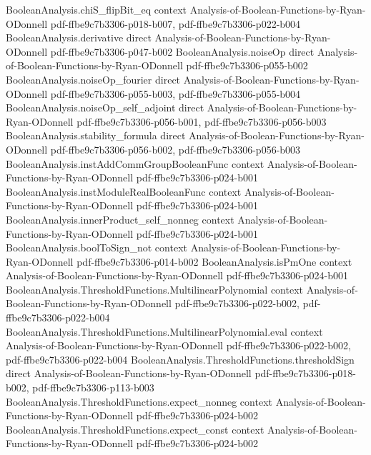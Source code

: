 \begin{lemma}
\proofstep
  {BooleanAnalysis.chiS_flipBit_eq}
  {context}
  {Analysis-of-Boolean-Functions-by-Ryan-ODonnell}
  {pdf-ffbe9c7b3306-p018-b007,
    pdf-ffbe9c7b3306-p022-b004}
\proofstep
  {BooleanAnalysis.derivative}
  {direct}
  {Analysis-of-Boolean-Functions-by-Ryan-ODonnell}
  {pdf-ffbe9c7b3306-p047-b002}
\proofstep
  {BooleanAnalysis.noiseOp}
  {direct}
  {Analysis-of-Boolean-Functions-by-Ryan-ODonnell}
  {pdf-ffbe9c7b3306-p055-b002}
\proofstep
  {BooleanAnalysis.noiseOp_fourier}
  {direct}
  {Analysis-of-Boolean-Functions-by-Ryan-ODonnell}
  {pdf-ffbe9c7b3306-p055-b003,
    pdf-ffbe9c7b3306-p055-b004}
\proofstep
  {BooleanAnalysis.noiseOp_self_adjoint}
  {direct}
  {Analysis-of-Boolean-Functions-by-Ryan-ODonnell}
  {pdf-ffbe9c7b3306-p056-b001,
    pdf-ffbe9c7b3306-p056-b003}
\proofstep
  {BooleanAnalysis.stability_formula}
  {direct}
  {Analysis-of-Boolean-Functions-by-Ryan-ODonnell}
  {pdf-ffbe9c7b3306-p056-b002,
    pdf-ffbe9c7b3306-p056-b003}
\proofstep
  {BooleanAnalysis.instAddCommGroupBooleanFunc}
  {context}
  {Analysis-of-Boolean-Functions-by-Ryan-ODonnell}
  {pdf-ffbe9c7b3306-p024-b001}
\proofstep
  {BooleanAnalysis.instModuleRealBooleanFunc}
  {context}
  {Analysis-of-Boolean-Functions-by-Ryan-ODonnell}
  {pdf-ffbe9c7b3306-p024-b001}
\proofstep
  {BooleanAnalysis.innerProduct_self_nonneg}
  {context}
  {Analysis-of-Boolean-Functions-by-Ryan-ODonnell}
  {pdf-ffbe9c7b3306-p024-b001}
\proofstep
  {BooleanAnalysis.boolToSign_not}
  {context}
  {Analysis-of-Boolean-Functions-by-Ryan-ODonnell}
  {pdf-ffbe9c7b3306-p014-b002}
\proofstep
  {BooleanAnalysis.isPmOne}
  {context}
  {Analysis-of-Boolean-Functions-by-Ryan-ODonnell}
  {pdf-ffbe9c7b3306-p024-b001}
\proofstep
  {BooleanAnalysis.ThresholdFunctions.MultilinearPolynomial}
  {context}
  {Analysis-of-Boolean-Functions-by-Ryan-ODonnell}
  {pdf-ffbe9c7b3306-p022-b002,
    pdf-ffbe9c7b3306-p022-b004}
\proofstep
  {BooleanAnalysis.ThresholdFunctions.MultilinearPolynomial.eval}
  {context}
  {Analysis-of-Boolean-Functions-by-Ryan-ODonnell}
  {pdf-ffbe9c7b3306-p022-b002,
    pdf-ffbe9c7b3306-p022-b004}
\proofstep
  {BooleanAnalysis.ThresholdFunctions.thresholdSign}
  {direct}
  {Analysis-of-Boolean-Functions-by-Ryan-ODonnell}
  {pdf-ffbe9c7b3306-p018-b002,
    pdf-ffbe9c7b3306-p113-b003}
\proofstep
  {BooleanAnalysis.ThresholdFunctions.expect_nonneg}
  {context}
  {Analysis-of-Boolean-Functions-by-Ryan-ODonnell}
  {pdf-ffbe9c7b3306-p024-b002}
\proofstep
  {BooleanAnalysis.ThresholdFunctions.expect_const}
  {context}
  {Analysis-of-Boolean-Functions-by-Ryan-ODonnell}
  {pdf-ffbe9c7b3306-p024-b002}
\proofstep

\end{lemma}
